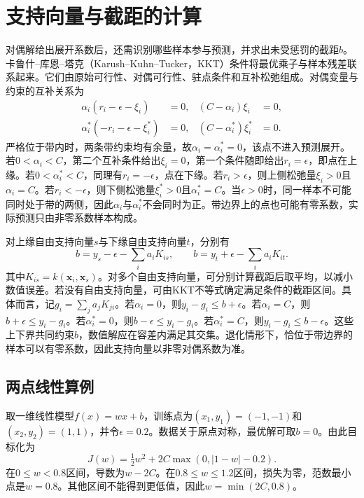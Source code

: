 \section{支持向量与截距的计算}
对偶解给出展开系数后，还需识别哪些样本参与预测，并求出未受惩罚的截距$b$。卡鲁什--库恩--塔克（Karush--Kuhn--Tucker，KKT）条件将最优乘子与样本残差联系起来。它们由原始可行性、对偶可行性、驻点条件和互补松弛组成。对偶变量与约束的互补关系为
\begin{align}
 \alpha_i(r_i-\epsilon-\xi_i)&=0,
 &(C-\alpha_i)\xi_i&=0,\\
 \alpha_i^*(-r_i-\epsilon-\xi_i^*)&=0,
 &(C-\alpha_i^*)\xi_i^*&=0.
 \label{eq:svr-kkt-complementarity}
\end{align}
严格位于带内时，两条带约束均有余量，故$\alpha_i=\alpha_i^*=0$，该点不进入预测展开。若$0<\alpha_i<C$，第二个互补条件给出$\xi_i=0$，第一个条件随即给出$r_i=\epsilon$，即点在上缘。若$0<\alpha_i^*<C$，同理有$r_i=-\epsilon$，点在下缘。若$r_i>\epsilon$，则上侧松弛量$\xi_i>0$且$\alpha_i=C$。若$r_i< -\epsilon$，则下侧松弛量$\xi_i^*>0$且$\alpha_i^*=C$。当$\epsilon>0$时，同一样本不可能同时处于带的两侧，因此$\alpha_i$与$\alpha_i^*$不会同时为正。带边界上的点也可能有零系数，实际预测只由非零系数样本构成。

对上缘自由支持向量$s$与下缘自由支持向量$t$，分别有
\begin{equation}
 b=y_s-\epsilon-\sum_i a_iK_{is},\qquad
 b=y_t+\epsilon-\sum_i a_iK_{it}.
\end{equation}
其中$K_{is}=k(\bm x_i,\bm x_s)$。对多个自由支持向量，可分别计算截距后取平均，以减小数值误差。若没有自由支持向量，可由KKT不等式确定满足条件的截距区间。具体而言，记$g_i=\sum_j a_jK_{ji}$。若$\alpha_i=0$，则$y_i-g_i\le b+\epsilon$。若$\alpha_i=C$，则$b+\epsilon\le y_i-g_i$。若$\alpha_i^*=0$，则$b-\epsilon\le y_i-g_i$。若$\alpha_i^*=C$，则$y_i-g_i\le b-\epsilon$。这些上下界共同约束$b$，数值解应在容差内满足其交集。退化情形下，恰位于带边界的样本可以有零系数，因此支持向量以非零对偶系数为准。

\subsection{两点线性算例}
取一维线性模型$f(x)=wx+b$，训练点为$(x_1,y_1)=(-1,-1)$和$(x_2,y_2)=(1,1)$，并令$\epsilon=0.2$。数据关于原点对称，最优解可取$b=0$。由此目标化为
\begin{equation}
 J(w)=\tfrac12w^2+2C\max(0,|1-w|-0.2).
\end{equation}
在$0\le w<0.8$区间，导数为$w-2C$。在$0.8\le w\le1.2$区间，损失为零，范数最小点是$w=0.8$。其他区间不能得到更低值，因此$w=\min(2C,0.8)$。

